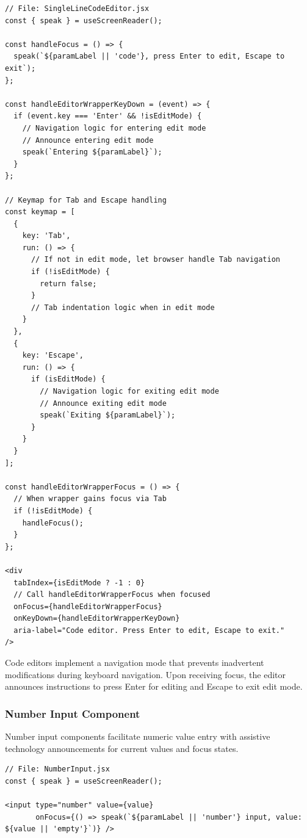 \begin{lstlisting}[caption={Code editor navigation mode}, label={lst:codeeditor-sr}]
// File: SingleLineCodeEditor.jsx
const { speak } = useScreenReader();

const handleFocus = () => {
  speak(`${paramLabel || 'code'}, press Enter to edit, Escape to exit`);
};

const handleEditorWrapperKeyDown = (event) => {
  if (event.key === 'Enter' && !isEditMode) {
    // Navigation logic for entering edit mode
    // Announce entering edit mode
    speak(`Entering ${paramLabel}`);
  }
};

// Keymap for Tab and Escape handling
const keymap = [
  {
    key: 'Tab',
    run: () => {
      // If not in edit mode, let browser handle Tab navigation
      if (!isEditMode) {
        return false;
      }
      // Tab indentation logic when in edit mode
    }
  },
  {
    key: 'Escape',
    run: () => {
      if (isEditMode) {
        // Navigation logic for exiting edit mode
        // Announce exiting edit mode
        speak(`Exiting ${paramLabel}`);
      }
    }
  }
];

const handleEditorWrapperFocus = () => {
  // When wrapper gains focus via Tab
  if (!isEditMode) {
    handleFocus();
  }
};

<div
  tabIndex={isEditMode ? -1 : 0}
  // Call handleEditorWrapperFocus when focused
  onFocus={handleEditorWrapperFocus}
  onKeyDown={handleEditorWrapperKeyDown}
  aria-label="Code editor. Press Enter to edit, Escape to exit."
/>
\end{lstlisting}

Code editors implement a navigation mode that prevents inadvertent modifications during keyboard navigation. Upon receiving focus, the editor announces instructions to press Enter for editing and Escape to exit edit mode.

\subsubsection{Number Input Component}

Number input components facilitate numeric value entry with assistive technology announcements for current values and focus states.

\begin{lstlisting}[caption={Number input with value announcement}, label={lst:number-sr}]
// File: NumberInput.jsx
const { speak } = useScreenReader();

<input type="number" value={value} 
       onFocus={() => speak(`${paramLabel || 'number'} input, value: ${value || 'empty'}`)} />
\end{lstlisting}

